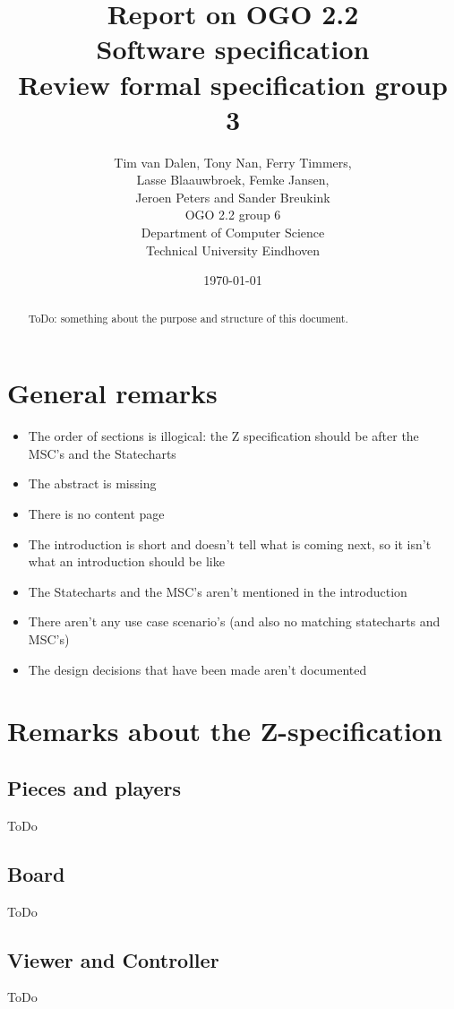 \documentclass[a4paper,11pt]{article}
\title{Report on OGO 2.2 \\ Software specification\\ Review formal specification group 3}
\author{
        Tim van Dalen, Tony Nan, Ferry Timmers, \\ Lasse Blaauwbroek, Femke Jansen, \\Jeroen Peters and Sander Breukink\\ OGO 2.2 group 6 \\
                Department of Computer Science\\
        Technical University Eindhoven\\
}
\date{\today}
\begin{document}
\maketitle

\begin{abstract}
ToDo: something about the purpose and structure of this document.
\end{abstract}

\newpage
	
	\tableofcontents
	\newpage
	
	\section{General remarks}
    \begin{itemize}
        \item The order of sections is illogical: the Z specification should be after the MSC's and the Statecharts
        \item The abstract is missing
        \item There is no content page
        \item The introduction is short and doesn't tell what is coming next, so it isn't what an introduction should be like
        \item The Statecharts and the MSC's aren't mentioned in the introduction
        \item There aren't any use case scenario's (and also no matching statecharts and MSC's)
        \item The design decisions that have been made aren't documented
    \end{itemize}
	
	\section{Remarks about the Z-specification}

    \subsection{Pieces and players}
    ToDo
    
    \subsection{Board}
    ToDo
    
    \subsection{Viewer and Controller}
    ToDo
\end{document}
